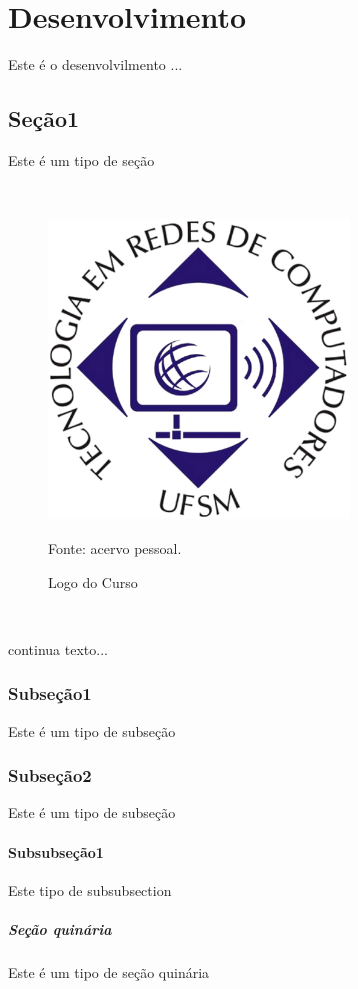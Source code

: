 \chapter{Desenvolvimento}

Este é o desenvolvilmento ...

\section{Seção1}
Este é um tipo de seção

\

\begin{figure}[!ht]
	\caption{Logo do Curso}
	\begin{center}
		\includegraphics[width=8cm,height=8cm]{imagens/logoREDES}
	\end{center}
	\small{Fonte: acervo pessoal.}
	\label{fig:redes}
\end{figure}

\

continua texto...
\subsection{Subseção1}
Este é um tipo de subseção

\subsection{Subseção2}
Este é um tipo de subseção

\subsubsection{Subsubseção1}
Este tipo de subsubsection

\paragraph{Seção quinária}
Este é um tipo de seção quinária

